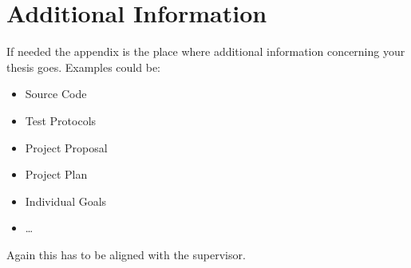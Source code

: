\chapter{Additional Information} \label{cha:additional-information}
If needed the appendix is the place where additional information concerning your thesis goes. Examples could be:
\begin{itemize}
	\item Source Code
	\item Test Protocols
	\item Project Proposal
	\item Project Plan
	\item Individual Goals
	\item \ldots
\end{itemize}
Again this has to be aligned with the supervisor.